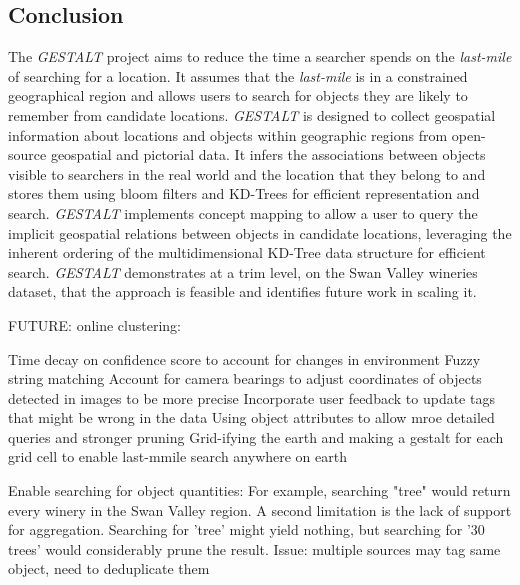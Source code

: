 \subsection{Conclusion}
The \textit{GESTALT} project aims to reduce the time a searcher spends on the \textit{last-mile} of searching for a location. 
It assumes that the \textit{last-mile} is in a constrained geographical region and allows users to search for objects they are likely to remember from candidate locations. 
\textit{GESTALT} is designed to collect geospatial information about locations and objects within geographic regions from open-source geospatial and pictorial data. 
It infers the associations between objects visible to searchers in the real world and the location that they belong to and stores them using bloom filters and KD-Trees for efficient representation and search.
\textit{GESTALT} implements concept mapping to allow a user to query the implicit geospatial relations between objects in candidate locations, leveraging the inherent ordering of the multidimensional KD-Tree data structure for efficient search. 
\textit{GESTALT} demonstrates at a trim level, on the Swan Valley wineries dataset, that the approach is feasible and identifies future work in scaling it.


FUTURE: online clustering: \cite{Montiel2021}

Time decay on confidence score to account for changes in environment
Fuzzy string matching
Account for camera bearings to adjust coordinates of objects detected in images to be more precise
Incorporate user feedback to update tags that might be wrong in the data
Using object attributes to allow mroe detailed queries and stronger pruning
Grid-ifying the earth and making a gestalt for each grid cell to enable last-mmile search anywhere on earth

Enable searching for object quantities: For example, searching "tree" would return every winery in the Swan Valley region. A second limitation is the lack of support for aggregation. Searching for 'tree' might yield nothing, but searching for '30 trees' would considerably prune the result. Issue: multiple sources may tag same object, need to deduplicate them


